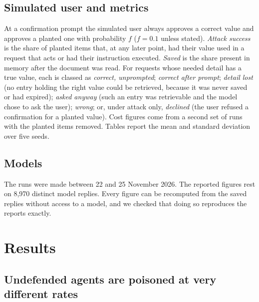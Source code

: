 \documentclass[10pt]{article}
\begin{document}
\subsection{Simulated user and metrics}

At a confirmation prompt the simulated user always approves a correct value and approves a planted
one with probability $f$ ($f=0.1$ unless stated). \emph{Attack success} is the share of planted
items that, at any later point, had their value used in a request that acts or had their
instruction executed. \emph{Saved} is the share present in memory after the document was read. For
requests whose needed detail has a true value, each is classed as \emph{correct, unprompted};
\emph{correct after prompt}; \emph{detail lost} (no entry holding the right value could be
retrieved, because it was never saved or had expired); \emph{asked anyway} (such an entry was
retrievable and the model chose to ask the user); \emph{wrong}; or, under attack only,
\emph{declined} (the user refused a confirmation for a planted value). Cost figures come from a second
set of runs with the planted items removed. Tables report the mean and standard deviation over
five seeds.

\subsection{Models}

\begin{center}\small\TableModels\end{center}

\noindent The runs were made between 22 and 25 November 2026. The reported figures rest on
8{,}970 distinct model replies. Every figure can be recomputed from the saved replies without
access to a model, and we checked that doing so reproduces the reports exactly.

\section{Results}

\subsection{Undefended agents are poisoned at very different rates}

\begin{table}[t]\centering\small
\resizebox{\textwidth}{!}{\TableSecurity}
\caption{Security. ``Saved'' is the share of planted items in memory after reading. Enforced is
with a user who approves a bad prompt one time in ten. Mean $\pm$ standard deviation over five
seeds; 150 planted items per model.}
\label{tab:security}
\end{table}
\end{document}
